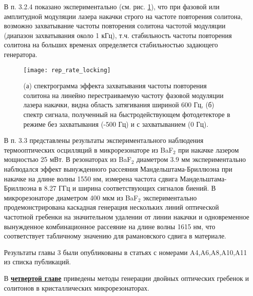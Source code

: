 В п. 3.2.4 показано экспериментально (см. рис. \ref{rep_rate_locking}), что при фазовой или амплитудной модуляции лазера накачки строго на частоте повторения солитона, возможно захватывание частоты повторения солитона частотой модуляции (диапазон захватывания около 1 кГц), т.ч. стабильность частоты повторения солитона на больших временах определяется стабильностью задающего генератора.

\begin{figure}[!htb]
  \centering
  \texttt{[image: rep\_rate\_locking]}
  \caption{(а) спектрограмма эффекта захватывания частоты повторения солитона на линейно перестраиваемую частоту фазовой модуляции лазера накачки, видна область затягивания шириной 600 Гц, (б) спектр сигнала, полученный на быстродействующем фотодетекторе в режиме без захватывания (-500 Гц) и с захватыванием (0 Гц).}
  \label{rep_rate_locking}
\end{figure}

В п. 3.3 представлены результаты экспериментального наблюдения термооптических осцилляций в микрорезонаторе из BaF$_2$ при накачке лазером мощностью 25 мВт. В резонаторах из BaF$_2$ диаметром 3.9 мм экспериментально наблюдался эффект вынужденного рассеяния Мандельштама-Бриллюэна при накачке на длине волны 1550 нм, измерена частота сдвига Мандельштама-Бриллюэна в 8.27 ГГц и ширина соответствующих сигналов биений. В микрорезонаторе диаметром 400 мкм из BaF$_2$ экспериментально продемонстрирована каскадная генерация нескольких линий оптической частотной гребенки на значительном удалении от линии накачки и одновременное вынужденное комбинационное рассеяние на длине волны 1615 нм, что соответствует табличному значению для рамановского сдвига в материале.

Результаты главы 3 были опубликованы в статьях с номерами A4,A6,A8,A10,A11 из списка публикаций.

В \underline{\textbf{четвертой главе}} приведены методы генерации двойных оптических гребенок и солитонов в кристаллических микрорезонаторах.


